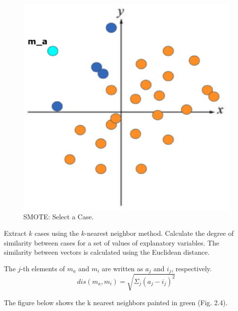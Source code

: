 \begin{center}
    \begin{figure}[ht]
        \caption{SMOTE: Select a Case.}
        \label{tab:team-rating-features}
        \begin{center}
            \includegraphics[scale=0.6]{image/smote2.eps}
        \end{center}
    \end{figure}
\end{center}

\clearpage

Extract $k$ cases using the $k$-nearest neighbor method. Calculate the degree of similarity between cases for a set of values of explanatory variables. The similarity between vectors is calculated using the Euclidean distance.

The $j$-th elements of $m_a$ and $m_i$ are written as $a_j$ and $i_j$, respectively.
$$
dis(m_a, m_i) = \sqrt{\Sigma_j(a_j - i_j)^2}
$$

The figure below shows the k nearest neighbors painted in green (Fig. 2.4).

